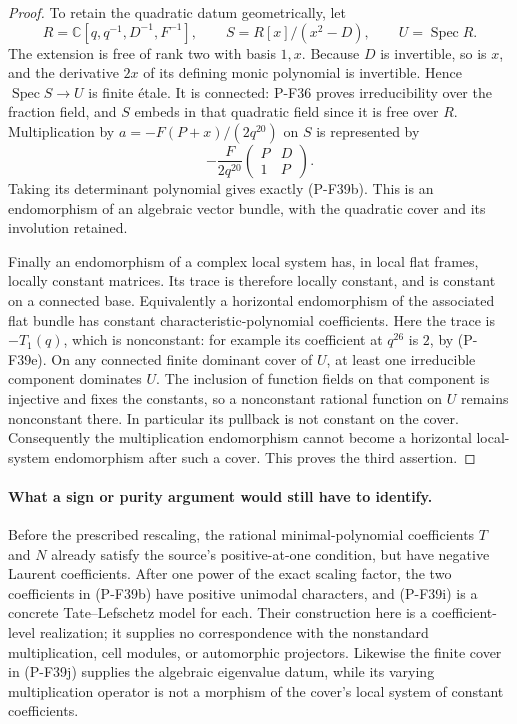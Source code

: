 \documentclass[11pt,a4paper]{article}
\begin{document}
\begin{proof}
To retain the quadratic datum geometrically, let
\[
 R=\mathbb C[q,q^{-1},D^{-1},F^{-1}],\qquad
 S=R[x]/(x^2-D),\qquad U=\operatorname{Spec}R.
\]
The extension is free of rank two with basis $1,x$.
Because $D$ is invertible, so is $x$, and the derivative
$2x$ of its defining monic polynomial is invertible.
Hence $\operatorname{Spec}S\to U$ is finite \'{e}tale.
It is connected: P-F36 proves irreducibility over the
fraction field, and $S$ embeds in that quadratic field
since it is free over $R$.
Multiplication by $a=-F(P+x)/(2q^{20})$ on $S$ is represented by
\[
 -\frac{F}{2q^{20}}
   \begin{pmatrix}P&D\\1&P\end{pmatrix}.
 \tag{P-F39j}
\]
Taking its determinant polynomial gives exactly (P-F39b).
This is an endomorphism of an algebraic vector bundle,
with the quadratic cover and its involution retained.

Finally an endomorphism of a complex local system has,
in local flat frames, locally constant matrices. Its trace
is therefore locally constant, and is constant on a connected
base. Equivalently a horizontal endomorphism of the associated
flat bundle has constant characteristic-polynomial coefficients.
Here the trace is $-T_1(q)$, which is nonconstant: for example
its coefficient at $q^{26}$ is $2$, by (P-F39e).
On any connected finite dominant cover of $U$, at least one
irreducible component dominates $U$. The inclusion of function
fields on that component is injective and fixes the constants,
so a nonconstant rational function on $U$ remains nonconstant
there. In particular its pullback is not constant on the cover.
Consequently the multiplication endomorphism cannot become
a horizontal local-system endomorphism after such a cover.
This proves the third assertion.
\end{proof}

\paragraph{What a sign or purity argument would still have to identify.}
Before the prescribed rescaling, the rational minimal-polynomial
coefficients $T$ and $N$ already satisfy the source's positive-at-one
condition, but have negative Laurent coefficients. After one power
of the exact scaling factor, the two coefficients in (P-F39b)
have positive unimodal characters, and (P-F39i) is a concrete
Tate--Lefschetz model for each. Their construction here is a
coefficient-level realization; it supplies no correspondence
with the nonstandard multiplication, cell modules, or automorphic
projectors. Likewise the finite cover in (P-F39j) supplies the
algebraic eigenvalue datum, while its varying multiplication
operator is not a morphism of the cover's local system of
constant coefficients.
\end{document}

